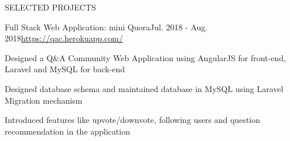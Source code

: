 \documentclass{resume} %
\begin{document}

\begin{rSection}{SELECTED PROJECTS}








\begin{rSubsection}{Full Stack Web Application: mini Quora}{Jul. 2018 - Aug. 2018}{\url{https://qac.herokuapp.com/}}{}
\item Designed a Q\&A Community Web Application using AngularJS for front-end, Laravel and MySQL for back-end
\item Designed database schema and maintained database in MySQL using Laravel Migration mechanism
\item Introduced features like upvote/downvote, following users and question recommendation in the application
\end{rSubsection} 


\end{rSection}
\end{document}
